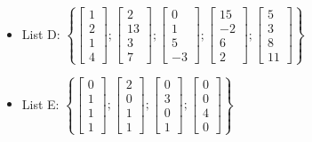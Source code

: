 \begin{itemize}
\item 
List D:
$\left\{\left[ \begin{array}{c} 1 \\ 2 \\ 1 \\ 4\end{array} \right] ; 
\left[ \begin{array}{c} 2 \\ 13 \\ 3 \\ 7\end{array} \right] ; 
\left[ \begin{array}{c} 0 \\ 1 \\ 5 \\ -3\end{array} \right] ;
\left[ \begin{array}{c} 15 \\ -2 \\ 6 \\ 2\end{array} \right] ;
\left[ \begin{array}{c} 5 \\ 3 \\ 8 \\ 11\end{array} \right] \right\} $

\item
List E:
$\left\{\left[ \begin{array}{c} 0 \\ 1 \\ 1 \\ 1 \end{array} \right] ; 
\left[ \begin{array}{c} 2 \\ 0 \\ 1 \\ 1 \end{array} \right] ;
\left[ \begin{array}{c} 0 \\ 3 \\ 0 \\ 1 \end{array} \right] ;
\left[ \begin{array}{c} 0 \\ 0 \\ 4 \\ 0 \end{array} \right] \right\}
$


\end{itemize}
